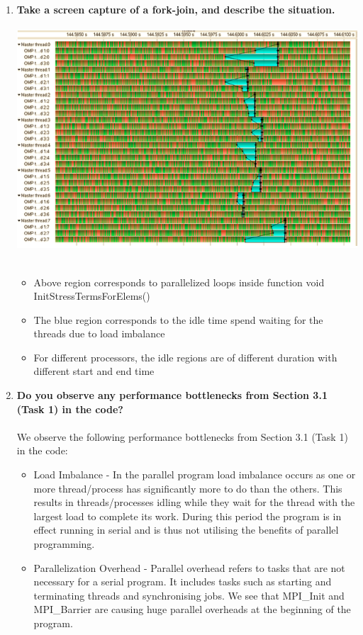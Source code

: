 \documentclass[10pt, letterpaper, twoside]{article}
\begin{document}
\begin{titlepage}
\begin{enumerate}
\item \textbf{Take a screen capture of a fork-join, and describe the situation.} \\ \\
\includegraphics[scale = 0.5]{fork.png} \\ \\
\begin{itemize}
	\item Above region corresponds to parallelized loops inside function void InitStressTermsForElems()
	\item The blue region corresponds to the idle time spend waiting for the threads due to load imbalance
	\item For different processors, the idle regions are of different duration with different start and end time
\end{itemize}


\item \textbf{Do you observe any performance bottlenecks from Section 3.1 (Task 1) in the code?} \\ \\
We observe the following performance bottlenecks from Section 3.1 (Task 1) in the code:
\begin{itemize}
	\item Load Imbalance - In the parallel program load imbalance occurs as one or more thread/process has significantly more to do than the others. This results in threads/processes idling while they wait for the thread with the largest load to complete its work. During this period the program is in effect running in serial and is thus not utilising the benefits of parallel programming.
	\item Parallelization Overhead - Parallel overhead refers to tasks that are not necessary for a serial program. It includes tasks such as starting and terminating threads and synchronising jobs. We see that MPI\_Init and MPI\_Barrier are causing huge parallel overheads at the beginning of the program.
\end{itemize}


\end{enumerate}
\end{titlepage}
\end{document}
